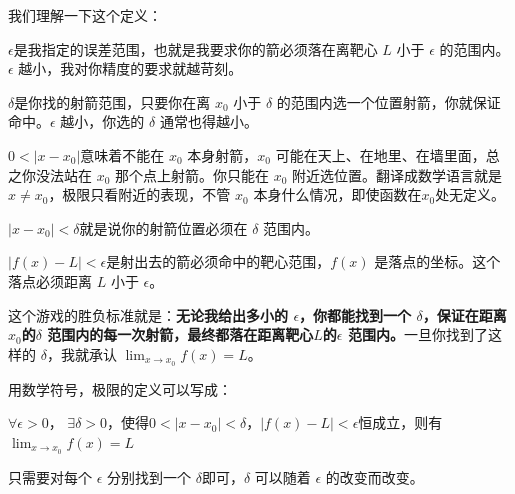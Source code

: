 \begin{center}
\end{center}

我们理解一下这个定义：

$\epsilon$是我指定的误差范围，也就是我要求你的箭必须落在离靶心 $L$ 小于 $\epsilon$ 的范围内。$\epsilon$ 越小，我对你精度的要求就越苛刻。

$\delta$是你找的射箭范围，只要你在离 $x_0$ 小于 $\delta$ 的范围内选一个位置射箭，你就保证命中。$\epsilon$ 越小，你选的 $\delta$ 通常也得越小。

$0 < |x - x_0|$意味着不能在 $x_0$ 本身射箭，$x_0$ 可能在天上、在地里、在墙里面，总之你没法站在 $x_0$ 那个点上射箭。你只能在 $x_0$ 附近选位置。翻译成数学语言就是 $x \neq x_0$，极限只看附近的表现，不管 $x_0$ 本身什么情况，即使函数在$x_0$处无定义。

$|x - x_0| < \delta$就是说你的射箭位置必须在 $\delta$ 范围内。

$|f(x) - L| < \epsilon$是射出去的箭必须命中的靶心范围，$f(x)$ 是落点的坐标。这个落点必须距离 $L$ 小于 $\epsilon$。


这个游戏的胜负标准就是：\textbf{无论我给出多小的 $\epsilon$，你都能找到一个 $\delta$，保证在距离$x_0$的$\delta$ 范围内的每一次射箭，最终都落在距离靶心$L$的$\epsilon$ 范围内。}一旦你找到了这样的 $\delta$，我就承认 $\lim_{x \to x_0} f(x) = L$。

用数学符号，极限的定义可以写成：

\begin{center}
  \(\forall \epsilon > 0\)，
  \(\exists \delta > 0\)，使得\(0 < |x - x_0| < \delta \)，\(|f(x) - L| < \epsilon\)恒成立，则有\(\lim_{x \to x_0} f(x) = L\)
\end{center}

只需要对每个 $\epsilon$ 分别找到一个 $\delta$即可，$\delta$ 可以随着 $\epsilon$ 的改变而改变。

